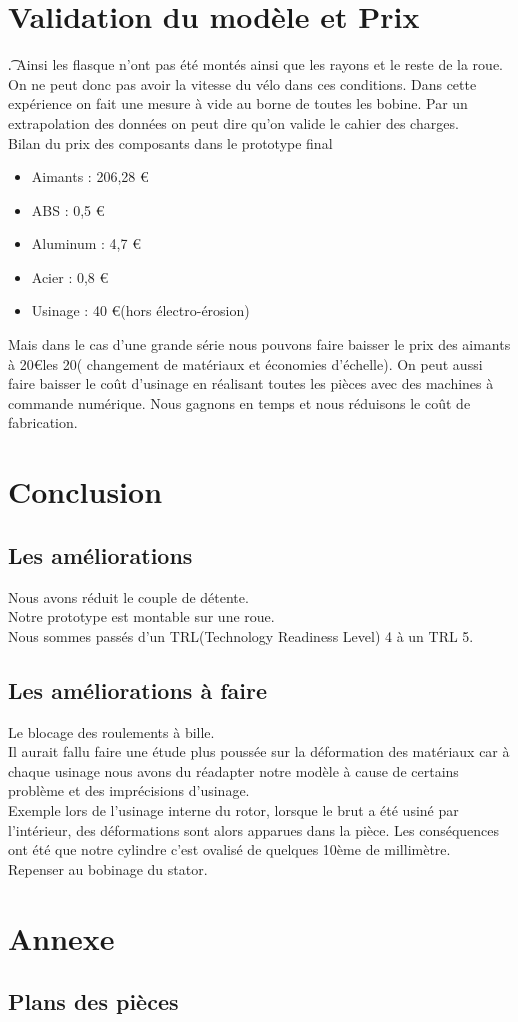 \documentclass[a4paper,12pt]{article} %
\begin{document}
\section{Validation du modèle et Prix}
\t . Ainsi les flasque n'ont pas été montés ainsi que les rayons et le reste de la roue. On ne peut donc pas avoir la vitesse du vélo dans ces conditions. Dans cette expérience on fait une mesure à vide au borne de toutes les bobine. Par un extrapolation des données on peut dire qu'on valide le cahier des charges.\\
Bilan du prix des composants dans le prototype final
\begin{itemize}
\item Aimants : 206,28 \euro
\item ABS : 0,5 \euro
\item Aluminum : 4,7 \euro
\item Acier : 0,8 \euro
\item Usinage : 40 \euro (hors électro-érosion)
\end{itemize}
Mais dans le cas d'une grande série nous pouvons faire baisser le prix des aimants à 20\euro les 20( changement de matériaux et économies d'échelle). On peut aussi faire baisser le coût d'usinage en réalisant toutes les pièces avec des machines à commande numérique. Nous gagnons en temps et nous réduisons le coût de fabrication.

\section{Conclusion}



\subsection*{Les améliorations}
Nous avons réduit le couple de détente.\\
Notre prototype est montable sur une roue.\\
Nous sommes passés d'un TRL(Technology Readiness Level) 4 à un TRL 5.\\

\subsection*{ Les améliorations à faire }
Le blocage des roulements à bille. \\
Il aurait fallu faire une étude plus poussée sur la déformation des matériaux car à chaque usinage nous avons du réadapter notre modèle à cause de certains problème et des imprécisions d'usinage. \\
Exemple lors de l'usinage interne du rotor, lorsque le brut a été usiné par l'intérieur, des déformations sont alors apparues dans la pièce. Les conséquences ont été que notre cylindre c'est ovalisé de quelques 10ème de millimètre.\\
Repenser au bobinage du stator.\\

\newpage
\appendix
\section{Annexe}
\subsection{Plans des pièces}
\end{document}
